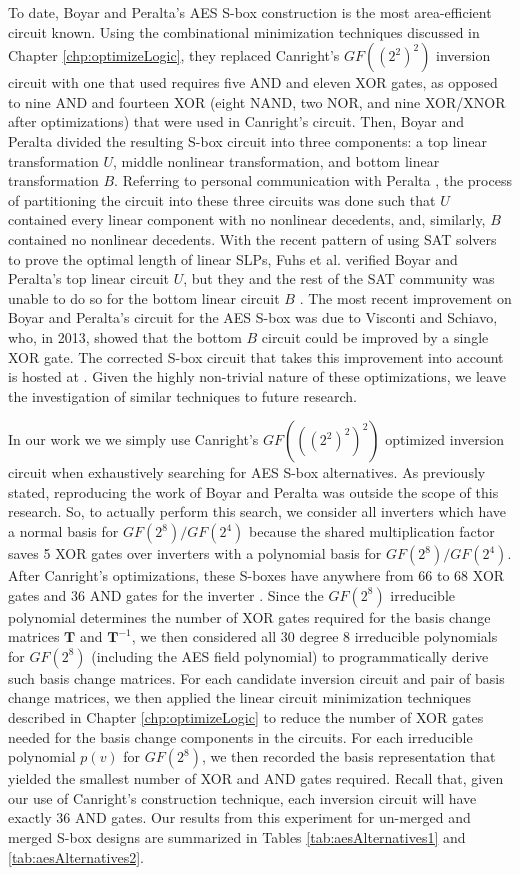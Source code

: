 To date, Boyar and Peralta's AES S-box construction is the most area-efficient circuit known. Using the combinational minimization techniques discussed in Chapter \ref{chp:optimizeLogic}, they replaced Canright's $GF((2^2)^2)$ inversion circuit with one that used requires five AND and eleven XOR gates, as opposed to nine AND and fourteen XOR (eight NAND, two NOR, and nine XOR/XNOR after optimizations) that were used in Canright's circuit. Then, Boyar and Peralta divided the resulting S-box circuit into three components: a top linear transformation $U$, middle nonlinear transformation, and bottom linear transformation $B$. Referring to personal communication with Peralta \cite{Peralta13-PC}, the process of partitioning the circuit into these three circuits was done such that $U$ contained every linear component with no nonlinear decedents, and, similarly, $B$ contained no nonlinear decedents. With the recent pattern of using SAT solvers to prove the optimal length of linear SLPs, Fuhs et al. \cite{Fuhs10-1} verified Boyar and Peralta's top linear circuit $U$, but they and the rest of the SAT community was unable to do so for the bottom linear circuit $B$ \cite{CMT}. The most recent improvement on Boyar and Peralta's circuit for the AES S-box was due to Visconti and Schiavo, who, in 2013, showed that the bottom $B$ circuit could be improved by a single XOR gate. The corrected S-box circuit that takes this improvement into account is hosted at \cite{CMT}. Given the highly non-trivial nature of these optimizations, we leave the investigation of similar techniques to future research. 

In our work we we simply use Canright's $GF(((2^2)^2)^2)$ optimized inversion circuit when exhaustively searching for AES S-box alternatives. As previously stated, reproducing the work of Boyar and Peralta was outside the scope of this research. So, to actually perform this search, we consider all inverters which have a normal basis for $GF(2^8)/GF(2^4)$ because the shared multiplication factor saves 5 XOR gates over inverters with a polynomial basis for $GF(2^8)/GF(2^4)$. After Canright's optimizations, these S-boxes have anywhere from 66 to 68 XOR gates and 36 AND gates for the inverter \cite{Canright05-1}. Since the $GF(2^8)$ irreducible polynomial determines the number of XOR gates required for the basis change matrices $\mathbf{T}$ and $\mathbf{T}^{-1}$, we then considered all $30$ degree 8 irreducible polynomials for $GF(2^8)$ (including the AES field polynomial) to programmatically derive such basis change matrices. For each candidate inversion circuit and pair of basis change matrices, we then applied the linear circuit minimization techniques described in Chapter \ref{chp:optimizeLogic} to reduce the number of XOR gates needed for the basis change components in the circuits. For each irreducible polynomial $p(v)$ for $GF(2^8)$, we then recorded the basis representation that yielded the smallest number of XOR and AND gates required. Recall that, given our use of Canright's construction technique, each inversion circuit will have exactly 36 AND gates. Our results from this experiment for un-merged and merged S-box designs are summarized in Tables \ref{tab:aesAlternatives1} and \ref{tab:aesAlternatives2}.

